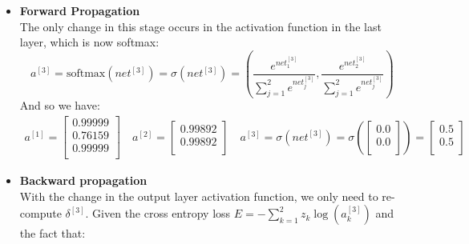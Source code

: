\documentclass{exam}
\begin{document}
\begin{questions}
\begin{itemize}
                \item \textbf{Forward Propagation} \\
                The only change in this stage occurs in the activation function in the last layer, which is now softmax:
                \begin{equation*}
                    a^{[3]} = \text{softmax}(net^{[3]}) = \sigma(net^{[3]}) = \left(\frac{e^{net^{[3]}_1}}{\sum_{j = 1}^{2}e^{net^{[3]}_j}},\frac{e^{net^{[3]}_2}}{\sum_{j = 1}^{2}e^{net^{[3]}_j}}\right)
                \end{equation*}  
                And so we have:
                \begin{align*}
                    a^{[1]} = 
                    \begin{bmatrix}
                        0.99999  \\
                        0.76159  \\
                        0.99999  \\
                    \end{bmatrix} \quad 
                    a^{[2]} = 
                    \begin{bmatrix}
                        0.99892  \\
                        0.99892  \\   
                    \end{bmatrix} \quad 
                    a^{[3]} = \sigma(net^{[3]}) = \sigma\left(
                    \begin{bmatrix}
                        0.0  \\
                        0.0  \\
                    \end{bmatrix} \right) =
                    \begin{bmatrix}
                        0.5  \\
                        0.5  \\
                    \end{bmatrix}
                \end{align*}     
                \item \textbf{Backward propagation} \\
                With the change in the output layer activation function, we only need to re-compute $\delta^{[3]}$. Given the cross entropy loss $E = -\sum_{k = 1}^{2} z_k \log(a^{[3]}_k)$ and the fact that:
                \begin{equation*}

\end{equation*}
\end{itemize}
\end{questions}
\end{document}
